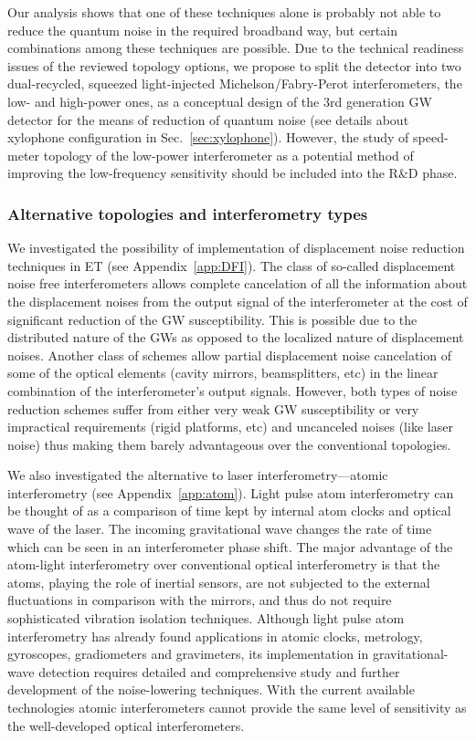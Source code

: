 Our analysis shows that one of these techniques alone is probably
not able to reduce the quantum noise in the required broadband
way, but certain combinations among these techniques are possible.
Due to the technical readiness issues of the reviewed topology options, we propose to split the detector into
two dual-recycled, squeezed light-injected Michelson/Fabry-Perot interferometers, the low- and
high-power ones, as a conceptual design of the
3rd generation GW detector for the means of reduction of quantum noise (see
details about xylophone configuration in Sec.~\ref{sec:xylophone}). However,
the study of speed-meter topology of the low-power interferometer as a potential method of improving the low-frequency sensitivity should be included into the R\&D phase.

\subsubsection{Alternative topologies and interferometry types}\label{sec:alttop}
We investigated the possibility of implementation of displacement
noise reduction techniques in ET (see Appendix~\ref{app:DFI}). The
class of so-called displacement noise free interferometers allows
complete cancelation of all the information about the displacement
noises from the output signal of the interferometer at the cost of
significant reduction of the GW susceptibility. This is possible due
to the distributed nature of the GWs as opposed to the localized
nature of displacement noises. Another class of schemes allow partial
displacement noise cancelation of some of the optical elements (cavity
mirrors, beamsplitters, etc) in the linear combination of the
interferometer's output signals. However, both types of noise
reduction schemes suffer from either very weak GW susceptibility or
very impractical requirements (rigid platforms, etc) and uncanceled
noises (like laser noise) thus making them barely advantageous over
the conventional topologies.


We also investigated the alternative to laser interferometry---atomic
interferometry (see Appendix~\ref{app:atom}). Light pulse atom
interferometry can be thought of as a comparison of time kept by
internal atom clocks and optical wave of the laser. The incoming
gravitational wave changes the rate of time which can be seen in an
interferometer phase shift. The major advantage of the atom-light
interferometry over conventional optical interferometry is that the
atoms, playing the role of inertial sensors, are not subjected to the
external fluctuations in comparison with the mirrors, and thus do not
require sophisticated vibration isolation techniques. Although light
pulse atom interferometry has already found applications in atomic
clocks, metrology, gyroscopes, gradiometers and gravimeters, its
implementation in gravitational-wave detection requires detailed and
comprehensive study and further development of the noise-lowering
techniques. With the current available technologies atomic
interferometers cannot provide the same level of sensitivity as the
well-developed optical interferometers.

